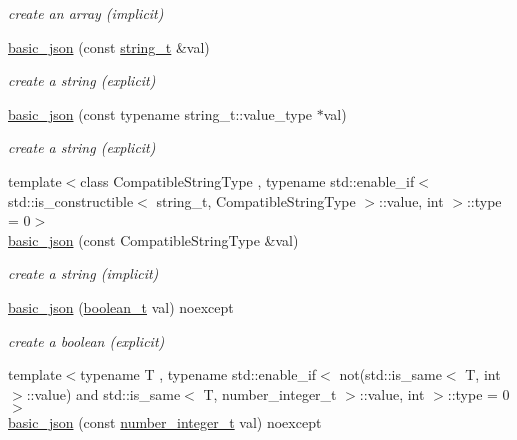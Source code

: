 \begin{DoxyCompactItemize}
\begin{DoxyCompactList}\small\item\em create an array (implicit) \end{DoxyCompactList}\item 
\hyperlink{classnlohmann_1_1basic__json_ab8b43d92a042dde96c28aeea81dd52de}{basic\+\_\+json} (const \hyperlink{classnlohmann_1_1basic__json_ab63e618bbb0371042b1bec17f5891f42}{string\+\_\+t} \&val)
\begin{DoxyCompactList}\small\item\em create a string (explicit) \end{DoxyCompactList}\item 
\hyperlink{classnlohmann_1_1basic__json_a3654da9a84deaf61899c4eee5b93c2c5}{basic\+\_\+json} (const typename string\+\_\+t\+::value\+\_\+type $\ast$val)
\begin{DoxyCompactList}\small\item\em create a string (explicit) \end{DoxyCompactList}\item 
{\footnotesize template$<$class Compatible\+String\+Type , typename std\+::enable\+\_\+if$<$ std\+::is\+\_\+constructible$<$ string\+\_\+t, Compatible\+String\+Type $>$\+::value, int $>$\+::type  = 0$>$ }\\\hyperlink{classnlohmann_1_1basic__json_ae85d91b0620650bcd9993e09d0e287d9}{basic\+\_\+json} (const Compatible\+String\+Type \&val)
\begin{DoxyCompactList}\small\item\em create a string (implicit) \end{DoxyCompactList}\item 
\hyperlink{classnlohmann_1_1basic__json_aac36af84d907b5c3e469af889661620a}{basic\+\_\+json} (\hyperlink{classnlohmann_1_1basic__json_af3bc3e83aa162d7ba4df16a949872723}{boolean\+\_\+t} val) noexcept
\begin{DoxyCompactList}\small\item\em create a boolean (explicit) \end{DoxyCompactList}\item 
{\footnotesize template$<$typename T , typename std\+::enable\+\_\+if$<$ not(std\+::is\+\_\+same$<$ T, int $>$\+::value) and std\+::is\+\_\+same$<$ T, number\+\_\+integer\+\_\+t $>$\+::value, int $>$\+::type  = 0$>$ }\\\hyperlink{classnlohmann_1_1basic__json_a0d838bc7ffca6017f51167e0a8ffd9b6}{basic\+\_\+json} (const \hyperlink{classnlohmann_1_1basic__json_ac4b10b2364f26ce47bdb9a413ff04a59}{number\+\_\+integer\+\_\+t} val) noexcept

\end{DoxyCompactItemize}
